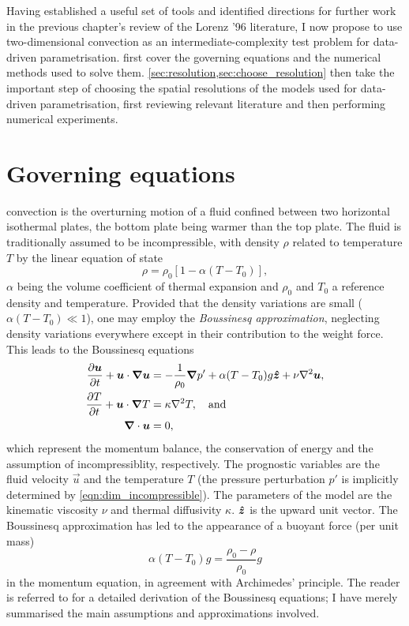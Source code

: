\documentclass[../main.tex]{subfiles}
\begin{document}
Having established a useful set of tools and identified directions for further
work in the previous chapter's review of the Lorenz '96 literature, I now
propose to use two-dimensional \rb{} convection as an intermediate-complexity
test problem for data-driven parametrisation.
 first cover the governing equations
and the numerical methods used to solve them.
\cref{sec:resolution,sec:choose_resolution} then take the important step of
choosing the spatial resolutions of the models used for data-driven
parametrisation, first reviewing relevant literature and then performing
numerical experiments.


\section{Governing equations}
\label{sec:rb_equations}
\rb{} convection is the overturning motion of a fluid confined between two
horizontal isothermal plates, the bottom plate being warmer than the top plate.
The fluid is traditionally assumed to be incompressible, with density $\rho$
related to temperature $T$ by the linear equation of state
\[
    \rho = \rho_0 [1 - \alpha(T - T_0)],
\]
$\alpha$ being the volume coefficient of thermal expansion and $\rho_0$ and
$T_0$ a reference density and temperature. Provided that the density variations
are small ($\alpha (T - T_0) \ll 1$), one may employ the \emph{Boussinesq
approximation}, neglecting density variations everywhere except in their
contribution to the weight force. This leads to the Boussinesq equations
\begin{align}
    \label{eqn:dim_momentum}
    \frac{\partial \bm{u}}{\partial t} + \bm{u} \cdot \bm{\nabla} \bm{u}
        &= -\frac{1}{\rho_0} \bm{\nabla} p' + \alpha (T - T_0) g \bm{\hat{z}}
            + \nu \nabla^2 \bm{u}, \\
    \label{eqn:dim_energy}
    \frac{\partial T}{\partial t} + \bm{u} \cdot \bm{\nabla} T &= \kappa \nabla^2 T,
        \quad \text{and} \\
    \label{eqn:dim_incompressible}
    \bm{\nabla} \cdot \bm{u} &= 0,
\end{align}
which represent the momentum balance, the conservation of energy and the
assumption of incompressiblity, respectively. The prognostic variables are the
fluid velocity $\vec{u}$ and the temperature $T$ (the pressure perturbation
$p'$ is implicitly determined by \cref{eqn:dim_incompressible}). The parameters
of the model are the kinematic viscosity $\nu$ and thermal diffusivity
$\kappa$. $\bm{\hat{z}}$ is the upward unit vector. The Boussinesq approximation
has led to the appearance of a buoyant force (per unit mass)
\[
    \alpha (T - T_0) g = \frac{\rho_0 - \rho}{\rho_0} g
\]
in the momentum equation, in agreement with Archimedes' principle. The reader
is referred to \textcite{chandrasekhar1961} for a detailed derivation of the
Boussinesq equations; I have merely summarised the main assumptions and
approximations involved.
\end{document}
